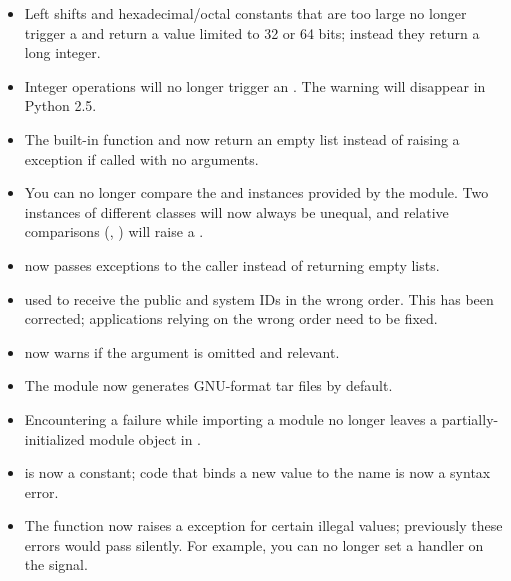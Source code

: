 \documentclass{howto}
\begin{document}
\begin{itemize}

\item Left shifts and hexadecimal/octal constants that are too 
  large no longer trigger a  and return 
  a value limited to 32 or 64 bits; instead they return a long integer.

\item Integer operations will no longer trigger an .
The  warning will disappear in Python 2.5.

\item The  built-in function and 
  now return  an empty list instead of raising a 
  exception if called with no arguments.

\item You can no longer compare the  and 
  instances provided by the  module.  Two 
  instances of different classes will now always be unequal, and 
  relative comparisons (\code{<}, \code{>}) will raise a .

\item {} now passes exceptions to the caller
      instead of returning empty lists.

\item {} used to receive the public and
  system IDs in the wrong order.  This has been corrected; applications
  relying on the wrong order need to be fixed.

\item {} now warns if the  
 argument is omitted and relevant.

\item The  module now generates GNU-format tar files
by default.

\item Encountering a failure while importing a module no longer leaves
a partially-initialized module object in .  

\item {} is now a constant; code that binds a new value to 
the name  is now a syntax error.

\item The  function now raises a
 exception for certain illegal values;
previously these errors would pass silently.  For example, you can no
longer set a handler on the  signal.

\end{itemize}
\end{document}

